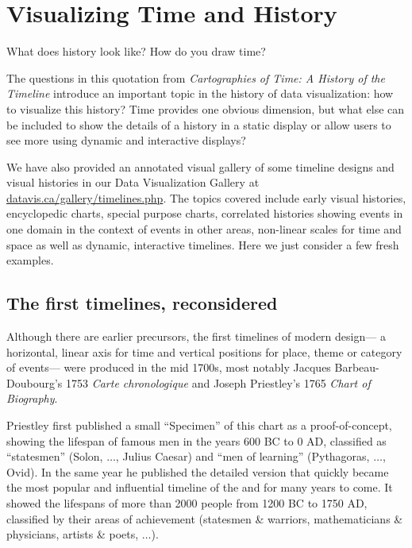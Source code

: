 \section{Visualizing Time and History}\label{sec:vistime}

\epigraph{What does history look like?  How do you draw time?}{\citet[p. 10]{RosenbergGrafton:2010}}
The questions in this quotation from \emph{Cartographies of Time: A History of the Timeline} \citep{RosenbergGrafton:2010}
introduce an important topic in the history of data visualization: how to visualize this history?
Time provides one obvious dimension, but what else can be included to show the details of a history in a static display
or allow users to see more using dynamic and interactive displays?

We have also provided an annotated visual gallery of some timeline designs and visual histories
in our Data Visualization Gallery at \url{datavis.ca/gallery/timelines.php}. The topics covered
include early visual histories, encyclopedic charts, special purpose charts, correlated histories
showing events in one domain in the context of events in other areas, non-linear scales for
time and space as well as dynamic, interactive timelines.  Here we just consider a few fresh examples.

\subsection{The first timelines, reconsidered}
Although there are earlier precursors, the first timelines of modern design---
a horizontal, linear axis for time and vertical positions for place, theme or category of events---
were produced in the mid 1700s, most notably Jacques Barbeau-Doubourg's 1753
\emph{Carte chronologique} and Joseph Priestley's 1765 \emph{Chart of Biography}.

Priestley first published a small ``Specimen'' of this chart as a proof-of-concept,
showing the lifespan of famous men in the years 600 BC to 0 AD, classified as
``statesmen'' (Solon,  $\dots$, Julius Caesar) and ``men of learning'' (Pythagoras, $\dots$, Ovid).
In the same year he published the detailed version \citep{Priestley:1765}
 that quickly became the most popular
and influential timeline of the  and for many years to come.  It showed the
lifespans of more than 2000 people from 1200 BC to 1750 AD, classified by their areas
of achievement (statesmen \& warriors, mathematicians \& physicians, artists \& poets, $\dots$).


